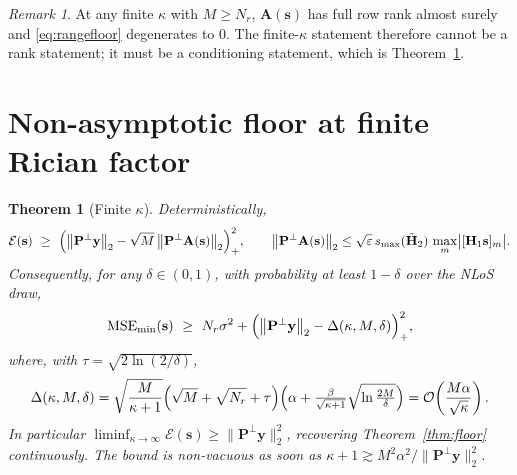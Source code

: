 \documentclass[11pt]{article}
\newtheorem{theorem}{Theorem}
\theoremstyle{remark}
\newtheorem{remark}{Remark}
\begin{document}
\begin{remark}
At any finite $\kappa$ with $M\ge N_r$, $\mathbf{A}(\mathbf{s})$ has full row
rank almost surely and \eqref{eq:rangefloor} degenerates to $0$. The
finite-$\kappa$ statement therefore cannot be a rank statement; it must be a
conditioning statement, which is Theorem~\ref{thm:finitekappa}.
\end{remark}

\section{Non-asymptotic floor at finite Rician factor}

\begin{theorem}[Finite $\kappa$]
\label{thm:finitekappa}
Deterministically,
\begin{equation}
\mathcal{E}(\mathbf{s})\ \ge\
\Bigl(\bigl\|\mathbf{P}^{\perp}\mathbf{y}\bigr\|_2
 -\sqrt{M}\,\bigl\|\mathbf{P}^{\perp}\mathbf{A}(\mathbf{s})\bigr\|_2
\Bigr)_{+}^{2},
\qquad
\bigl\|\mathbf{P}^{\perp}\mathbf{A}(\mathbf{s})\bigr\|_2
\le\sqrt{\varepsilon}\,s_{\max}(\tilde{\mathbf{H}}_2)\,
   \max_{m}\bigl|[\mathbf{H}_1\mathbf{s}]_m\bigr|.
\label{eq:finitekappa}
\end{equation}
Consequently, for any $\delta\in(0,1)$, with probability at least $1-\delta$
over the NLoS draw,
\begin{equation}
\mathrm{MSE}_{\min}(\mathbf{s})\ \ge\ N_r\sigma^2
+\Bigl(\bigl\|\mathbf{P}^{\perp}\mathbf{y}\bigr\|_2
 -\Delta(\kappa,M,\delta)\Bigr)_{+}^{2},
\label{eq:finitekappaprob}
\end{equation}
where, with $\tau=\sqrt{2\ln(2/\delta)}$,
\begin{equation}
\Delta(\kappa,M,\delta)
=\sqrt{\frac{M}{\kappa+1}}
 \Bigl(\sqrt{M}+\sqrt{N_r}+\tau\Bigr)
 \Bigl(\alpha+\tfrac{\beta}{\sqrt{\kappa+1}}
  \sqrt{\ln\tfrac{2M}{\delta}}\Bigr)
=\mathcal{O}\!\left(\frac{M\alpha}{\sqrt{\kappa}}\right).
\label{eq:delta}
\end{equation}
In particular
$\liminf_{\kappa\to\infty}\mathcal{E}(\mathbf{s})
 \ge\|\mathbf{P}^{\perp}\mathbf{y}\|_2^2$, recovering
Theorem~\ref{thm:floor} continuously. The bound is non-vacuous as soon as
$\kappa+1\gtrsim M^2\alpha^2/\|\mathbf{P}^{\perp}\mathbf{y}\|_2^2$.
\end{theorem}
\end{document}
